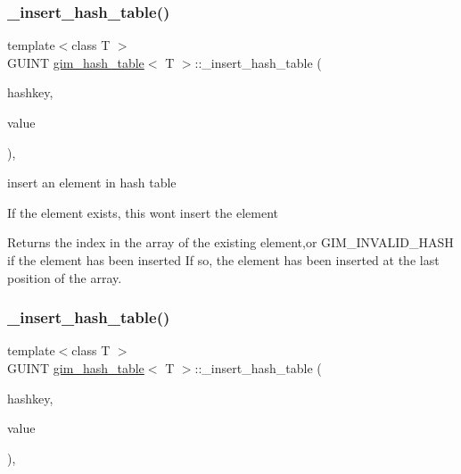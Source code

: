 \subsubsection{\texorpdfstring{\+\_\+insert\+\_\+hash\+\_\+table()}{\_insert\_hash\_table()}\hspace{0.1cm}{\footnotesize\ttfamily [1/2]}}
{\footnotesize\ttfamily template$<$class T $>$ \\
G\+U\+I\+NT \hyperlink{classgim__hash__table}{gim\+\_\+hash\+\_\+table}$<$ T $>$\+::\+\_\+insert\+\_\+hash\+\_\+table (\begin{DoxyParamCaption}\item[{G\+U\+I\+NT}]{hashkey,  }\item[{const T \&}]{value }\end{DoxyParamCaption})\hspace{0.3cm}{\ttfamily [inline]}, {\ttfamily [protected]}}



insert an element in hash table 

If the element exists, this won\textquotesingle{}t insert the element \begin{DoxyReturn}{Returns}
the index in the array of the existing element,or G\+I\+M\+\_\+\+I\+N\+V\+A\+L\+I\+D\+\_\+\+H\+A\+SH if the element has been inserted If so, the element has been inserted at the last position of the array. 
\end{DoxyReturn}
\mbox{\label{classgim__hash__table_a4339a279d721d1e687b8d8063332bac8}} 
\subsubsection{\texorpdfstring{\+\_\+insert\+\_\+hash\+\_\+table()}{\_insert\_hash\_table()}\hspace{0.1cm}{\footnotesize\ttfamily [2/2]}}
{\footnotesize\ttfamily template$<$class T $>$ \\
G\+U\+I\+NT \hyperlink{classgim__hash__table}{gim\+\_\+hash\+\_\+table}$<$ T $>$\+::\+\_\+insert\+\_\+hash\+\_\+table (\begin{DoxyParamCaption}\item[{G\+U\+I\+NT}]{hashkey,  }\item[{const T \&}]{value }\end{DoxyParamCaption})\hspace{0.3cm}{\ttfamily [inline]}, {\ttfamily [protected]}}




